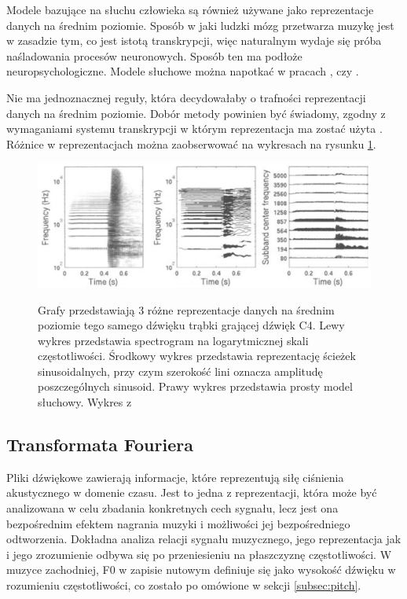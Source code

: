 \documentclass[12pt,a4paper,twoside]{mwart}
\begin{document}
Modele bazujące na słuchu człowieka są również używane jako reprezentacje danych na średnim poziomie. Sposób w jaki ludzki mózg przetwarza muzykę jest w zasadzie tym, co jest istotą transkrypcji, więc naturalnym wydaje się próba naśladowania procesów neuronowych. Sposób ten ma podłoże neuropsychologiczne. Modele słuchowe można napotkać w pracach \cite{Transcription:Karjalainen:MultipitchAnalysisModel}, \cite{Transcription:Zatorre:AuditoryCortex} czy \cite{Transcription:Meddis:VirtualPitchOnNerve}.

Nie ma jednoznacznej reguły, która decydowałaby o trafności reprezentacji danych na średnim poziomie. Dobór metody powinien być świadomy, zgodny z wymaganiami systemu transkrypcji w którym reprezentacja ma zostać użyta \cite[13-15]{Transcription:Zatorre:AuditoryCortex}. Różnice w reprezentacjach można zaobserwować na wykresach na rysunku \ref{fig:mid_level_representation}. 

\begin{figure}[t]
  \begin{center}
  \includegraphics[scale=0.3]{images/mid_level_representation.jpg}\\
  \caption{Grafy przedstawiają 3 różne reprezentacje danych na średnim poziomie tego samego dźwięku trąbki grającej dźwięk C4. Lewy wykres przedstawia spectrogram na logarytmicznej skali częstotliwości. Środkowy wykres przedstawia reprezentację ścieżek sinusoidalnych, przy czym szerokość lini oznacza amplitudę poszczególnych sinusoid. Prawy wykres przedstawia prosty model słuchowy. Wykres z \cite[14]{Transcription:Zatorre:AuditoryCortex}}
  \label{fig:mid_level_representation}
  \end{center}
\end{figure}

\subsection{Transformata Fouriera}\label{sec:TF}
Pliki dźwiękowe zawierają informacje, które reprezentują siłę ciśnienia akustycznego w domenie czasu. Jest to jedna z reprezentacji, która może być analizowana w celu zbadania konkretnych cech sygnału, lecz jest ona bezpośrednim efektem nagrania muzyki i możliwości jej bezpośredniego odtworzenia. Dokładna analiza relacji sygnału muzycznego, jego reprezentacja jak i jego zrozumienie odbywa się po przeniesieniu na płaszczyznę częstotliwości. W muzyce zachodniej, F0 w zapisie nutowym definiuje się jako wysokość dźwięku w rozumieniu częstotliwości, co zostało po omówione w sekcji \ref{subsec:pitch}.
\end{document}
